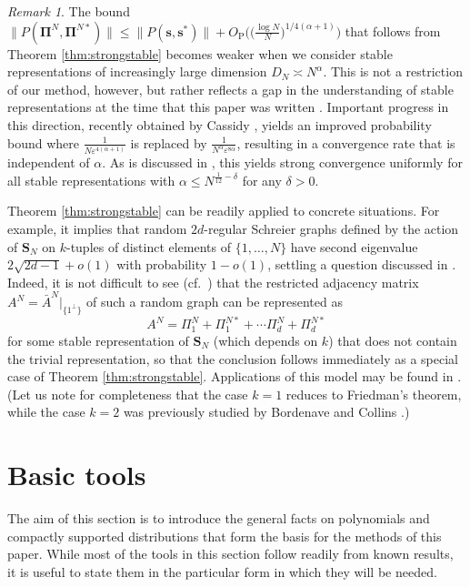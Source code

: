 \documentclass[10pt,reqno]{amsart}
\theoremstyle{definition}
\theoremstyle{remark}
\newtheorem{rem}[thm]{Remark}
\numberwithin{equation}{section}
\numberwithin{figure}{section}
\numberwithin{table}{section}
\newcommand{\Opr}{O_\mathrm{P}}
\begin{document}
\begin{rem}
\label{rem:cassidy}
The bound $\|P(\boldsymbol{\Pi}^N,\boldsymbol{\Pi}^{N*})\| \le 
\|P(\boldsymbol{s},\boldsymbol{s}^*)\| + \Opr\big(\big(\frac{\log 
N}{N}\big)^{1/4(\alpha+1)}\big)$ that follows from Theorem 
\ref{thm:strongstable} becomes weaker when we consider stable 
representations of increasingly large dimension $D_N\asymp N^\alpha$. This 
is not a restriction of our method, however, but rather reflects a gap in 
the understanding of stable representations at the time that this paper
was written \cite[Conjecture 1.8]{HP23}. Important progress in this 
direction, recently obtained by Cassidy \cite{Cas24}, yields an
improved probability bound where $\frac{1}{N\varepsilon^{4(\alpha+1)}}$ 
is replaced by $\frac{1}{N^\alpha \varepsilon^{8\alpha}}$, resulting in a 
convergence rate that is independent of $\alpha$. As is discussed in
\cite{Cas24}, this yields strong convergence uniformly 
for all stable representations with $\alpha\le N^{\frac{1}{12}-\delta}$
for any $\delta>0$.
\end{rem}

Theorem \ref{thm:strongstable} can be readily applied to concrete 
situations. For example, it implies that random 
$2d$-regular Schreier graphs defined by the action of $\mathbf{S}_N$ on 
$k$-tuples of distinct elements of $\{1,\ldots,N\}$ have second 
eigenvalue $2\sqrt{2d-1}+o(1)$ with probability $1-o(1)$, settling a 
question discussed in \cite[\S 1.4]{HP23}. Indeed, it is not difficult 
to see (cf.\ \cite[\S 8]{HP23}) that the restricted adjacency matrix
$A^N=\bar A^N|_{\{1^\perp\}}$ of such a random graph can be represented as
$$
	A^N = \Pi_1^N + \Pi_1^{N*} + \cdots \Pi_d^N + \Pi_d^{N*}
$$
for some stable representation of $\mathbf{S}_N$ (which depends on $k$)
that does not contain the trivial representation,
so that the conclusion follows immediately as a special case
of Theorem \ref{thm:strongstable}. Applications of this model may be found 
in \cite{FJRST96,HH09}. (Let us note for completeness that the case $k=1$ 
reduces to Friedman's theorem, while the case $k=2$ was previously studied
by Bordenave and Collins \cite[\S 1.6]{BC19}.)


\section{Basic tools}
\label{sec:basic}

The aim of this section is to introduce the general facts on polynomials 
and compactly supported distributions that form the basis for the methods 
of this paper. While most of the tools in this section follow readily from 
known results, it is useful to state them in the particular form in which 
they will be needed.
\end{document}
